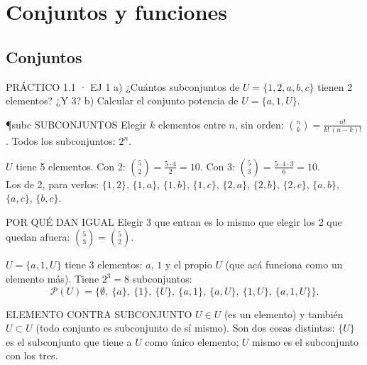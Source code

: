 \chapter{Conjuntos y funciones}

\newcommand{\mini}[2]{%
\begin{tikzpicture}[x=0.2cm,y=0.2cm]
\begin{scope}\clip (-5.5,-5.5) rectangle (5.5,5.5); #2 \end{scope}
\draw[suave!70,-{Stealth[length=3pt]}] (-5.5,0)--(5.6,0); \draw[suave!70,-{Stealth[length=3pt]}] (0,-5.5)--(0,5.6);
\node[font=\ttfamily\scriptsize,anchor=north west] at (-5.5,5.5) {#1};
\end{tikzpicture}}

\section{Conjuntos}

\begin{enunciado}{PRÁCTICO 1.1 · EJ 1}
a) ¿Cuántos subconjuntos de $U=\{1,2,a,b,c\}$ tienen 2 elementos? ¿Y 3? \quad b) Calcular el conjunto potencia de $U=\{a,1,U\}$.
\end{enunciado}
\begin{uso}{\P{subc} SUBCONJUNTOS}
Elegir $k$ elementos entre $n$, sin orden: $\binom nk=\frac{n!}{k!\,(n-k)!}$. Todos los subconjuntos: $2^n$.
\end{uso}
$U$ tiene 5 elementos. Con 2: $\binom52=\frac{5\cdot4}{2}=10$. Con 3: $\binom53=\frac{5\cdot4\cdot3}{6}=10$.\\
Los de 2, para verlos: $\{1,2\}$, $\{1,a\}$, $\{1,b\}$, $\{1,c\}$, $\{2,a\}$, $\{2,b\}$, $\{2,c\}$, $\{a,b\}$, $\{a,c\}$, $\{b,c\}$.
\begin{tip}{POR QUÉ DAN IGUAL}
Elegir 3 que entran es lo mismo que elegir los 2 que quedan afuera: $\binom53=\binom52$.
\end{tip}
$U=\{a,1,U\}$ tiene 3 elementos: $a$, $1$ y el propio $U$ (que acá funciona como un elemento más). Tiene $2^3=8$ subconjuntos:
\[\mathcal P(U)=\big\{\emptyset,\ \{a\},\ \{1\},\ \{U\},\ \{a,1\},\ \{a,U\},\ \{1,U\},\ \{a,1,U\}\big\}.\]
\begin{trampa}{ELEMENTO CONTRA SUBCONJUNTO}
$U\in U$ (es un elemento) y también $U\subset U$ (todo conjunto es subconjunto de sí mismo). Son dos cosas distintas: $\{U\}$ es el subconjunto que tiene a $U$ como único elemento; $U$ mismo es el subconjunto con los tres.
\end{trampa}

